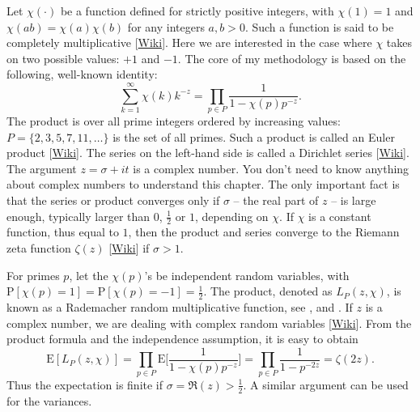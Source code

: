 \documentclass[oneside,10pt]{book}
\begin{document}
Let $\chi(\cdot)$ be a function defined for strictly positive integers, with $\chi(1)=1$ and $\chi(ab)=\chi(a)\chi(b)$ for 
any integers $a,b>0$. Such a function is said to be
\textcolor{index}{completely multiplicative} [\href{https://en.wikipedia.org/wiki/Completely_multiplicative_function}{Wiki}]. 
Here we are interested in the case where $\chi$ takes on two possible values: $+1$ and $-1$. The core of my methodology is based on the following, well-known identity:
\begin{equation}
\sum_{k=1}^\infty \chi(k) k^{-z} = \prod_{p\in P} \frac{1}{1-\chi(p) p^{-z}}.\label{bore}
\end{equation}
The product is over all prime integers ordered by increasing values: $P=\{2,3,5,7,11,\dots\}$ is the set of all primes. Such a product is called an \textcolor{index}{Euler product} [\href{https://en.wikipedia.org/wiki/Euler_product}{Wiki}]. The series on the left-hand side is called
a \textcolor{index}{Dirichlet series} [\href{https://en.wikipedia.org/wiki/Dirichlet_series}{Wiki}]. The argument $z=\sigma+it$ is a complex number. You don't need to know anything about complex numbers to understand this chapter. The only important fact is that the series or product converges only if $\sigma$ -- the real part of $z$ -- is large enough, typically larger than $0$, $\frac{1}{2}$ or $1$, depending on $\chi$. If $\chi$ is a constant function, thus equal to $1$, then the product and series converge to the
 \textcolor{index}{Riemann zeta function} $\zeta(z)$ [\href{https://en.wikipedia.org/wiki/Riemann_zeta_function}{Wiki}] if $\sigma>1$.

For primes $p$,  let the $\chi(p)$'s be independent random variables, with $\text{P}[\chi(p)=1] =  \text{P}[\chi(p)=-1] =\frac{1}{2}$.
The product, denoted as $L_P(z,\chi)$, is known as a \textcolor{index}{Rademacher random multiplicative function}, see \cite{harper2020bb}, \cite{harper2020} and \cite{yukkam2013}. If $z$ is a complex number, we are dealing with
 \textcolor{index}{complex random variables} [\href{https://en.wikipedia.org/wiki/Complex_random_variable}{Wiki}]. From the product formula and the independence assumption, it is easy to obtain
\begin{equation}
\text{E} [L_P(z,\chi)]=\prod_{p\in P} \text{E}\bigg[\frac{1}{1-\chi(p)p^{-z}}\bigg]=\prod_{p\in P }\frac{1}{1-p^{-2z}}=\zeta(2z).\label{proofrn}
\end{equation}
Thus the expectation is finite if $\sigma=\Re(z)>\frac{1}{2}$. A similar argument can be used for the variances. 
\end{document}
